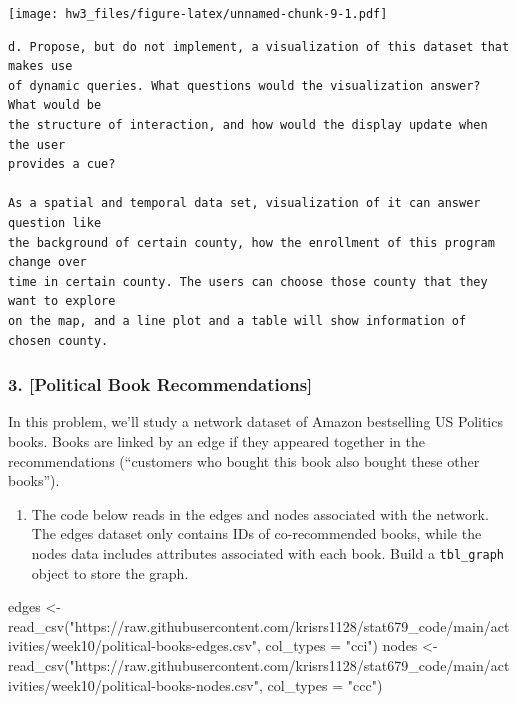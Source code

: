 \documentclass[
]{article}
\newenvironment{Shaded}{\begin{snugshade}}{\end{snugshade}}
\newcommand{\AttributeTok}[1]{\textcolor[rgb]{0.77,0.63,0.00}{#1}}
\newcommand{\FunctionTok}[1]{\textcolor[rgb]{0.00,0.00,0.00}{#1}}
\newcommand{\NormalTok}[1]{#1}
\newcommand{\OtherTok}[1]{\textcolor[rgb]{0.56,0.35,0.01}{#1}}
\newcommand{\StringTok}[1]{\textcolor[rgb]{0.31,0.60,0.02}{#1}}
\providecommand{\tightlist}{%
  \setlength{\itemsep}{0pt}\setlength{\parskip}{0pt}}
\begin{document}
\texttt{[image: hw3\_files/figure-latex/unnamed-chunk-9-1.pdf]}

\begin{verbatim}
d. Propose, but do not implement, a visualization of this dataset that makes use
of dynamic queries. What questions would the visualization answer? What would be
the structure of interaction, and how would the display update when the user
provides a cue?

As a spatial and temporal data set, visualization of it can answer question like 
the background of certain county, how the enrollment of this program change over 
time in certain county. The users can choose those county that they want to explore 
on the map, and a line plot and a table will show information of chosen county.
\end{verbatim}

\hypertarget{political-book-recommendations}{%
\subsubsection{3. {[}Political Book
Recommendations{]}}\label{political-book-recommendations}}

In this problem, we'll study a network dataset of Amazon bestselling US
Politics books. Books are linked by an edge if they appeared together in
the recommendations (``customers who bought this book also bought these
other books'').

\begin{enumerate}
\def\labelenumi{\alph{enumi}.}
\tightlist
\item
  The code below reads in the edges and nodes associated with the
  network. The edges dataset only contains IDs of co-recommended books,
  while the nodes data includes attributes associated with each book.
  Build a \texttt{tbl\_graph} object to store the graph.
\end{enumerate}

\begin{Shaded}
\begin{Highlighting}[]
\NormalTok{edges }\OtherTok{\textless{}{-}} \FunctionTok{read\_csv}\NormalTok{(}\StringTok{"https://raw.githubusercontent.com/krisrs1128/stat679\_code/main/activities/week10/political{-}books{-}edges.csv"}\NormalTok{, }\AttributeTok{col\_types =} \StringTok{"cci"}\NormalTok{)}
\NormalTok{nodes }\OtherTok{\textless{}{-}} \FunctionTok{read\_csv}\NormalTok{(}\StringTok{"https://raw.githubusercontent.com/krisrs1128/stat679\_code/main/activities/week10/political{-}books{-}nodes.csv"}\NormalTok{, }\AttributeTok{col\_types =} \StringTok{"ccc"}\NormalTok{)}
\end{Highlighting}
\end{Shaded}
\end{document}
